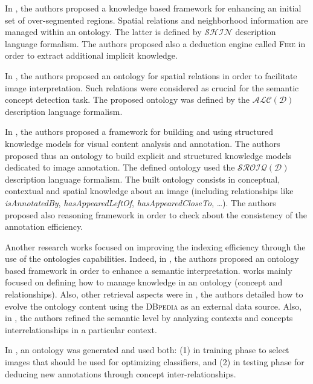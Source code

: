 		In \citep{Simou2008}, the authors proposed a knowledge based framework for enhancing an initial 
		set of over-segmented regions. Spatial relations and neighborhood information are managed within
		an ontology. The latter is defined by $\mathcal{SHIN}$ description language formalism. 
		The authors proposed also a deduction engine called \textsc{Fire} in order to extract additional
		implicit knowledge.

		In \citep{Hudelot2010}, the authors proposed an ontology for spatial relations in order to 
		facilitate image interpretation. Such relations were considered as crucial for the semantic 
		concept detection task. The proposed ontology was defined by the $\mathcal{ALC(D)}$ description
		language formalism.

		In \citep{Bannour2014}, the authors proposed a framework for building and using structured 
		knowledge models for visual content analysis and annotation. The authors proposed thus an 
		ontology to build explicit and structured knowledge models dedicated to image annotation.
		The defined ontology used the $\mathcal{SROIQ(D)}$ description language formalism.
		The built ontology consists in conceptual, contextual and spatial knowledge about an image 
		(including relationships like \emph{isAnnotatedBy}, \emph{hasAppearedLeftOf}, 
		\emph{hasAppearedCloseTo}, \dots{}). The authors proposed also reasoning framework in 
		order to check about the consistency of the annotation efficiency.

		Another research works focused on improving the indexing efficiency through the use of
		the ontologies capabilities.  Indeed, in \citep{Leite2008,Cheng2012,Mukesh2013}, 
		the authors proposed an ontology based framework in order to enhance a semantic interpretation. 
		 works mainly focused on defining how  to manage knowledge in an ontology
		(concept and relationships). Also, other retrieval aspects were  in 
		\citep{Rodriguez-Garcia2012}, the authors detailed how to evolve the ontology
		content using the \textsc{DBpedia} as an external data source. Also, in \citep{Mustafa2008}, 
		the authors  refined the semantic level by analyzing contexts and concepts interrelationships
		in a particular context. 
		
		In \citep{Reshma2014}, an ontology was generated and used both: (1) in training 
		phase to select images that should be used for optimizing classifiers, and (2)
		in testing phase for deducing new annotations through concept inter-relationships. 

